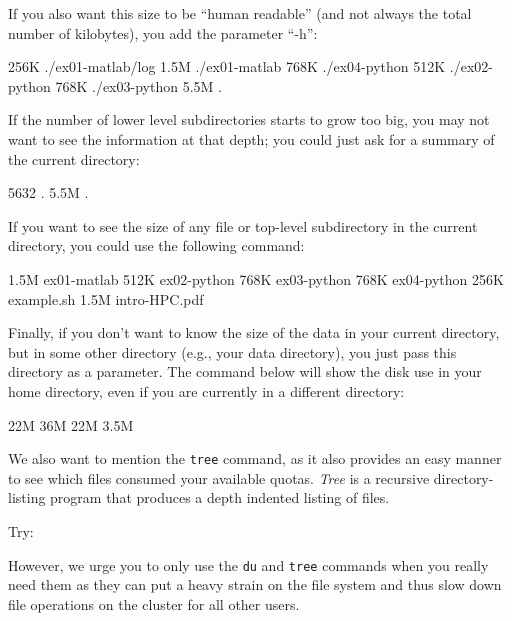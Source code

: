 If you also want this size to be ``human readable'' (and not always the total
number of kilobytes), you add the parameter ``-h'':

\begin{prompt}
256K ./ex01-matlab/log
1.5M ./ex01-matlab
768K ./ex04-python
512K ./ex02-python
768K ./ex03-python
5.5M .
\end{prompt}

If the number of lower level subdirectories starts to grow too big, you may not
want to see the information at that depth; you could just ask for a summary of
the current directory:

\begin{prompt}
5632 .
5.5M .
\end{prompt}

If you want to see the size of any file or top-level subdirectory in the
current directory, you could use the following command:

\begin{prompt}
1.5M ex01-matlab
512K ex02-python
768K ex03-python
768K ex04-python
256K example.sh
1.5M intro-HPC.pdf
\end{prompt}


Finally, if you don't want to know the size of the data in your current
directory, but in some other directory (e.g., your data directory), you just
pass this directory as a parameter. The command below will show the disk use
in your home directory, even if you are currently in a different directory:

\begin{prompt}
22M %
36M %
22M %
3.5M %
\end{prompt}

\ifgent
\else
  We also want to mention the \texttt{tree} command, as it also provides an easy
  manner to see which files consumed your available quotas. \emph{Tree} is a
  recursive directory-listing program that produces a depth indented listing of
  files.

  Try:

\begin{prompt}
\end{prompt}

However, we urge you to only use the \texttt{du} and \texttt{tree} commands when you
really need them as they can put a heavy strain on the file system and thus
slow down file operations on the cluster for all other users.
\fi

